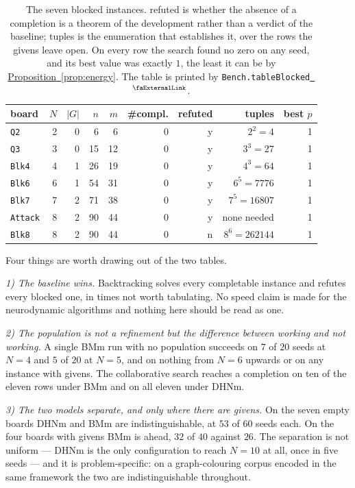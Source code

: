 \documentclass{easychair}
\newcommand{\propref}[1]{\textcolor{academicpurple}{\hyperref[#1]{Proposition~\ref*{#1}}}}
\newcommand{\extlink}{~\ensuremath{{}^\text{\faExternalLink}}}
\newcommand{\repoowner}{mkaratarakis/HNBM}
\newcommand{\reporef}{1bd91612ee31180f6c99fa11090b713f3012ead4}
\newcommand{\repo}{https://github.com/\repoowner/blob/\reporef}
\newcommand{\srcl}[2]{\href{\repo/#1\#L#2}{\extlink}}
\newcommand{\qsrc}[2]{\srcl{HopfieldNet/QUBO/Instances/Queens/#1}{#2}}
\begin{document}
\begin{table}[H]
\centering\footnotesize
\setlength{\tabcolsep}{4.5pt}
\begin{tabular}{@{}lrrrr rr rr@{}}
\toprule
board & $N$ & $|G|$ & $n$ & $m$ & \#compl. & refuted & tuples & best $p$\\
\midrule
\texttt{Q2}     & 2 & 0 & 6  & 6  & 0 & y & $2^2 = 4$      & 1\\
\texttt{Q3}     & 3 & 0 & 15 & 12 & 0 & y & $3^3 = 27$     & 1\\
\texttt{Blk4}   & 4 & 1 & 26 & 19 & 0 & y & $4^3 = 64$     & 1\\
\texttt{Blk6}   & 6 & 1 & 54 & 31 & 0 & y & $6^5 = 7776$   & 1\\
\texttt{Blk7}   & 7 & 2 & 71 & 38 & 0 & y & $7^5 = 16807$  & 1\\
\texttt{Attack} & 8 & 2 & 90 & 44 & 0 & y & none needed    & 1\\
\texttt{Blk8}   & 8 & 2 & 90 & 44 & 0 & n & $8^6 = 262144$ & 1\\
\bottomrule
\end{tabular}
\caption{The seven blocked instances. \textsf{refuted} is whether the absence of a completion is a
theorem of the development rather than a verdict of the baseline; \textsf{tuples} is the enumeration
that establishes it, over the rows the givens leave open. On every row the search found no zero on
any seed, and its best value was exactly $1$, the least it can be by \propref{prop:energy}. The
table is printed by \texttt{Bench.tableBlocked}\qsrc{Bench.lean}{292}.}\label{tab:blocked}
\end{table}

Four things are worth drawing out of the two tables.

\emph{1) The baseline wins.} Backtracking solves every completable instance and refutes every
blocked one, in times not worth tabulating. No speed claim is made for the neurodynamic algorithms
and nothing here should be read as one.

\emph{2) The population is not a refinement but the difference between working and not working.} A
single BMm run with no population succeeds on $7$ of $20$ seeds at $N = 4$ and $5$ of $20$ at
$N = 5$, and on nothing from $N = 6$ upwards or on any instance with givens. The collaborative
search reaches a completion on ten of the eleven rows under BMm and on all eleven under DHNm.

\emph{3) The two models separate, and only where there are givens.} On the seven empty boards DHNm
and BMm are indistinguishable, at $53$ of $60$ seeds each. On the four boards with givens BMm is
ahead, $32$ of $40$ against $26$. The separation is not uniform --- DHNm is the only configuration to
reach $N = 10$ at all, once in five seeds --- and it is problem-specific: on a graph-colouring corpus
encoded in the same framework the two are indistinguishable throughout.
\end{document}
